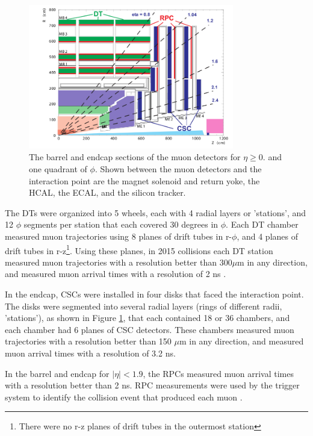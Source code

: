 \begin{figure}[ht]
	\centering
	\includegraphics[width=0.8\textwidth]{figures/muonDetectorLayout.png}
	\caption{The barrel and endcap sections of the muon detectors for $\eta \geq 0.$ and one quadrant of $\phi$.  Shown 
		between the muon detectors and the interaction point are the magnet solenoid and return yoke, the HCAL, the ECAL, 
		and the silicon tracker.}
	\label{fig:muonBarrelAndEndcapDetectors}
\end{figure}

The DTs were organized into 5 wheels, each with 4 radial layers or 'stations', and 12 $\phi$ segments per 
station that each covered 30 degrees in $\phi$.  Each DT chamber measured muon trajectories using 8 planes of 
drift tubes in r-$\phi$, and 4 planes of drift tubes in r-z\footnote{There were no r-z planes of drift tubes in 
the outermost station}.  Using these planes, in 2015 collisions each DT station measured muon trajectories 
with a resolution better than 300$\mu$m in any direction, and measured muon arrival times with a resolution of 2 ns \cite{cmsMuonRecoRunTwo}.  

In the endcap, CSCs were installed in four disks that faced the interaction point.  
The disks were segmented into several radial layers (rings of different radii, 'stations'), as shown in Figure 
\ref{fig:muonBarrelAndEndcapDetectors}, that each contained 18 or 36 chambers, and each chamber had 6 planes of CSC detectors.  
These chambers measured muon trajectories with a resolution better than 150 $\mu$m in any direction, and measured muon arrival 
times with a resolution of 3.2 ns.

In the barrel and endcap for $|\eta| < 1.9$, the RPCs measured muon arrival times with a resolution better than 
2 ns.  RPC measurements were used by the trigger system to identify the collision event that produced each muon \cite{cmsMuonRecoRunTwo}.

